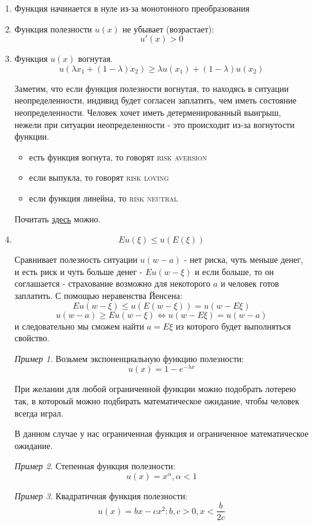 \documentclass[%
12pt, %
final, %
oneside, %
onecolumn, %
centertags]{article} %
\theoremstyle{plain}
\theoremstyle{definition}
\theoremstyle{remark}
\newtheorem{example}{Пример}
\begin{document}
\begin{enumerate}
	\item Функция начинается в нуле из-за монотонного преобразования
	\item Функция полезности $u(x)$ не убывает (возрастает):
	$$u'(x) > 0$$
	\item Функция $u(x)$ вогнутая. 
	$$u(\lambda x_1 +(1-\lambda)x_2) \geq \lambda u(x_1) + (1-\lambda)u(x_2)$$

	Заметим, что если функция полезности вогнутая, то находясь в ситуации неопределенности, индивид будет согласен заплатить, чем иметь состояние неопределенности. Человек хочет иметь детерменированный выигрыш, нежели при ситуации неопределенности - это происходит из-за вогнутости функции.
	\begin{itemize}
		\item есть функция вогнута, то говорят \textsc{risk aversion}
		\item если выпукла, то говорят \textsc{risk loving}
		\item если функция линейна, то \textsc{risk neutral}
	\end{itemize}

	Почитать \href{https://en.wikipedia.org/wiki/Risk_aversion}{здесь} можно.
	\item $$Eu(\xi) \leq u(E(\xi))$$
	
	Сравнивает полезность ситуации $u(w-a)$ - нет риска, чуть меньше денег, и есть риск и чуть больше денег - $Eu(w-\xi)$ и если больше, то он соглашается - страхование возможно для некоторого $a$ и человек готов заплатить. С помощью неравенства Йенсена:
	$$Eu(w-\xi)\leq u(E(w-\xi)) = u(w-E\xi)$$
	$$u(w-a) \geq Eu(w-\xi) \Leftrightarrow u(w-E\xi) = u(w-a)$$
	и следовательно мы сможем найти $a = E\xi$ из которого будет выполняться свойство.

	\begin{example}
		Возьмем экспоненциальную функцию полезности: $$u(x) = 1-e^{-\lambda x}$$

		При желании для любой ограниченной функции можно подобрать лотерею так, в котороый можно подбирать математическое ожидание, чтобы человек всегда играл.

		В данном случае у нас ограниченная функция и ограниченное математическое ожидание.
	\end{example}
	\begin{example}
		Степенная функция полезности: $$u(x)=x^{\alpha}, \alpha < 1$$
	\end{example}
	\begin{example}
		Квадратичная функция полезности:
		$$u(x) = bx - cx^2: b,c >0, x < \frac{b}{2c}$$
	\end{example}
\end{enumerate}
\end{document}
